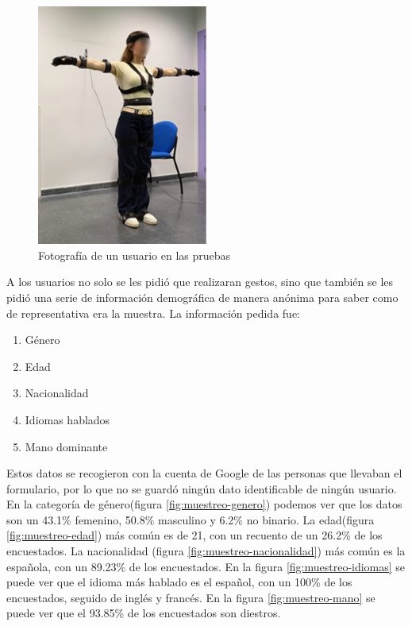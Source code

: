 \begin{figure}[H]
	\centering
	\includegraphics[width=0.5\textwidth]{Imagenes/Vectorial/LidiaPruebasBlurr.pdf}
	\caption{Fotografía de un usuario en las pruebas}
	\label{fig:PruebasLidia}
\end{figure}

A los usuarios no solo se les pidió que realizaran gestos, sino que también se les pidió una serie de información demográfica de manera anónima para saber como de representativa era la muestra. La información pedida fue:

\begin{enumerate}
	\item Género
	\item Edad
	\item Nacionalidad
	\item Idiomas hablados
	\item Mano dominante
\end{enumerate}

Estos datos se recogieron con la cuenta de Google de las personas que llevaban el formulario, por lo que no se guardó ningún dato identificable de ningún usuario. En la categoría de género(figura \ref{fig:muestreo-genero}) podemos ver que los datos son un 43.1\% femenino, 50.8\% masculino y 6.2\% no binario. La edad(figura \ref{fig:muestreo-edad}) más común es de 21, con un recuento de un 26.2\% de los encuestados. La nacionalidad (figura \ref{fig:muestreo-nacionalidad}) más común es la española, con un 89.23\% de los encuestados. En la figura \ref{fig:muestreo-idiomas} se puede ver que el idioma más hablado es el español, con un 100\% de los encuestados, seguido de inglés y francés. En la figura \ref{fig:muestreo-mano} se puede ver que el 93.85\% de los encuestados son diestros.

